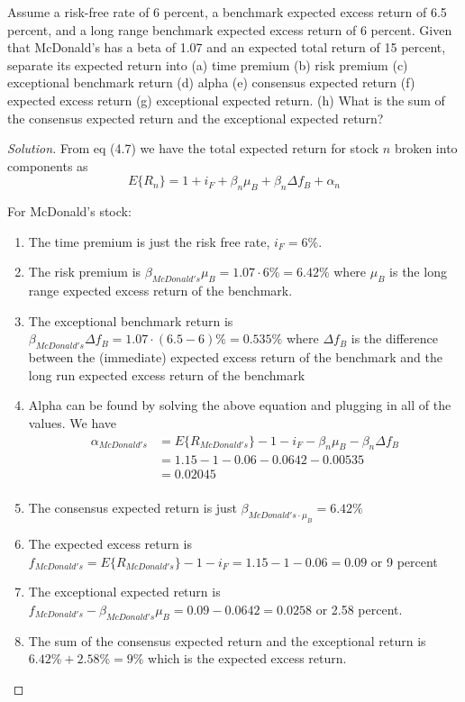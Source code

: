 \begin{problem}{4.1}
 Assume a risk-free rate of 6 percent, a benchmark expected excess return of 6.5 percent, and a long range benchmark expected excess return of 6 percent. Given that McDonald's has a beta of 1.07 and an expected total return of 15 percent, separate its expected return into (a) time premium (b) risk premium (c) exceptional benchmark return (d) alpha (e) consensus expected return (f) expected excess return (g) exceptional expected return. (h) What is the sum of the consensus expected return and the exceptional expected return?
\end{problem}

\begin{proof}[Solution]
 From eq (4.7) we have the total expected return for stock $n$ broken into components as
 \begin{equation*}
  E\{R_{n}\}=1+i_{F}+\beta_{n}\mu_{B}+\beta_{n}\Delta f_{B}+\alpha_{n}
 \end{equation*}
 
 For McDonald's stock:
 \begin{enumerate}[label=(\alph*)]
  \item{The time premium is just the risk free rate, $i_{F}=6\%$.}
  \item{The risk premium is $\beta_{McDonald's}\mu_{B}=1.07\cdot 6\%=6.42\%$ where $\mu_{B}$ is the long range expected excess return of the benchmark.}
  \item{The exceptional benchmark return is $\beta_{McDonald's}\Delta f_{B}=1.07\cdot(6.5-6)\%=0.535\%$ where $\Delta f_{B}$ is the difference between the (immediate) expected excess return of the benchmark and the long run expected excess return of the benchmark}
  \item{Alpha can be found by solving the above equation and plugging in all of the values. We have
	\begin{align*}
	 \alpha_{McDonald's}&=E\{R_{McDonald's}\}-1-i_{F}-\beta_{n}\mu_{B}-\beta_{n}\Delta f_{B} \\
			    &=1.15-1-0.06-0.0642-0.00535\\
			    &=0.02045\\
	\end{align*}
	}
  \item{The consensus expected return is just $\beta_{McDonald's\cdot\mu_{B}}=6.42\%$}
  \item{The expected excess return is $f_{McDonald's}=E\{R_{McDonald's}\}-1-i_{F}=1.15-1-0.06=0.09$ or 9 percent}
  \item{The exceptional expected return is $f_{McDonald's}-\beta_{McDonald's}\mu_{B}=0.09-0.0642=0.0258$ or 2.58 percent.}
  \item{The sum of the consensus expected return and the exceptional return is $6.42\% + 2.58\%=9\%$ which is the expected excess return.}
 \end{enumerate}
\end{proof}


